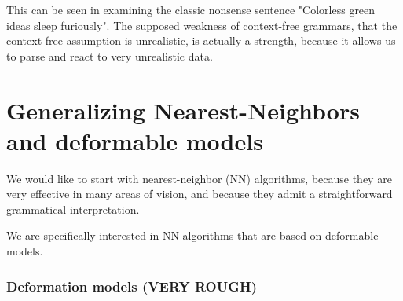 \documentclass{article}
\begin{document}
This can be seen in examining the classic nonsense sentence "Colorless
green ideas sleep furiously". The supposed weakness of context-free
grammars, that the context-free assumption is unrealistic, is actually a
strength, because it allows us to parse and react to very unrealistic data.

\section{Generalizing Nearest-Neighbors and deformable models}

We would like to start with nearest-neighbor (NN) algorithms, because
they are very effective in many areas of vision, and because they
admit a straightforward grammatical interpretation.

We are specifically interested in NN algorithms that are based on
deformable models.










\subsubsection{Deformation models (VERY ROUGH)}
\end{document}
